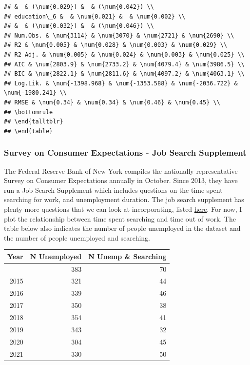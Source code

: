 \documentclass[
]{article}
\begin{document}
\begin{verbatim}
## &  & (\num{0.029}) &  & (\num{0.042}) \\
## education\_6 &  & \num{0.021} &  & \num{0.002} \\
## &  & (\num{0.032}) &  & (\num{0.046}) \\
## Num.Obs. & \num{3114} & \num{3070} & \num{2721} & \num{2690} \\
## R2 & \num{0.005} & \num{0.028} & \num{0.003} & \num{0.029} \\
## R2 Adj. & \num{0.005} & \num{0.024} & \num{0.003} & \num{0.025} \\
## AIC & \num{2803.9} & \num{2733.2} & \num{4079.4} & \num{3986.5} \\
## BIC & \num{2822.1} & \num{2811.6} & \num{4097.2} & \num{4063.1} \\
## Log.Lik. & \num{-1398.968} & \num{-1353.588} & \num{-2036.722} & \num{-1980.241} \\
## RMSE & \num{0.34} & \num{0.34} & \num{0.46} & \num{0.45} \\
## \bottomrule
## \end{talltblr}
## \end{table}
\end{verbatim}

\subsubsection{Survey on Consumer Expectations - Job Search
Supplement}\label{survey-on-consumer-expectations---job-search-supplement}

The Federal Reserve Bank of New York compiles the nationally
representative Survey on Consumer Expectations annually in October.
Since 2013, they have run a Job Search Supplement which includes
questions on the time spent searching for work, and unemployment
duration. The job search supplement has plenty more questions that we
can look at incorporating, listed
\href{https://www.newyorkfed.org/medialibrary/Interactives/sce/sce/downloads/data/SCE-Labor-Market-Survey-Data-Codebook.pdf?sc_lang=en}{here}.
For now, I plot the relationship between time spent searching and time
out of work. The table below also indicates the number of people
unemployed in the dataset and the number of people unemployed and
searching.

\begin{longtable}[]{@{}rrr@{}}
\toprule\noalign{}
Year & N Unemployed & N Unemp \& Searching \\
\midrule\noalign{}
\endhead
\bottomrule\noalign{}
\endlastfoot
2014 & 383 & 70 \\
2015 & 321 & 44 \\
2016 & 339 & 46 \\
2017 & 350 & 38 \\
2018 & 354 & 41 \\
2019 & 343 & 32 \\
2020 & 304 & 45 \\
2021 & 330 & 50 \\
\end{longtable}
\end{document}
